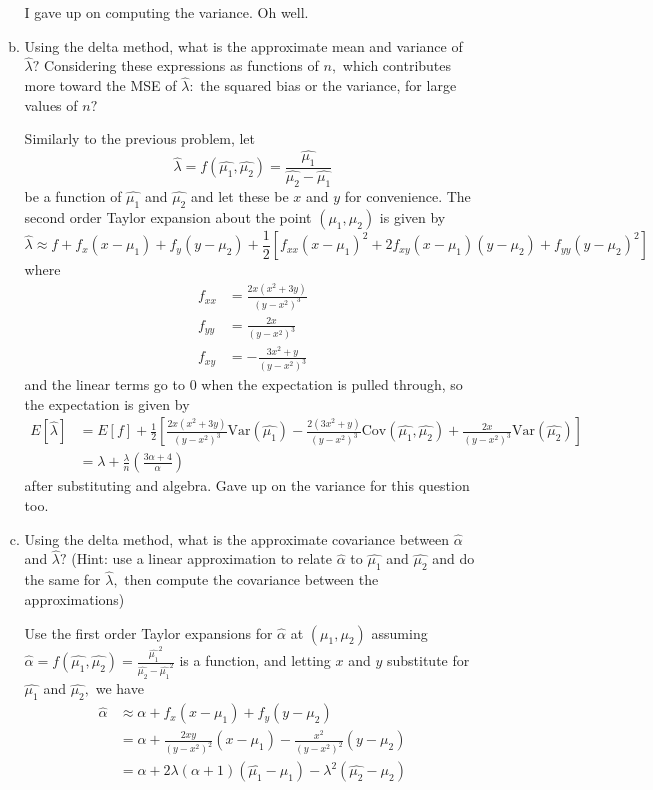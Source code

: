 \documentclass{article}
\newcommand{\var}{\mathrm{Var}}
\newcommand{\cov}{\mathrm{Cov}}
\begin{document}
\begin{enumerate}
\begin{enumerate}[(a)]
\begin{soln}
					I gave up on computing the variance. Oh well.

				\end{soln}

			\item Using the delta method, what is the approximate mean and variance of $\hat{\lambda}?$ Considering these expressions as functions of $n,$ which contributes more toward the MSE of $\hat{\lambda}:$ the squared bias or the variance, for large values of $n?$
				\begin{soln}
					Similarly to the previous problem, let \[\hat{\lambda}=f(\hat{\mu_1}, \hat{\mu_2})=\frac{\hat{\mu_1}}{\hat{\mu_2}-\hat{\mu_1}}\] be a function of $\hat{\mu_1}$ and $\hat{\mu_2}$ and let these be $x$ and $y$ for convenience. The second order Taylor expansion about the point $(\mu_1, \mu_2)$ is given by 
					\[\hat{\lambda} \approx f+f_x(x-\mu_1)+f_y(y-\mu_2)+\frac{1}{2}\left[ f_{xx}(x-\mu_1)^2+2f_{xy}(x-\mu_1)(y-\mu_2)+f_{yy}(y-\mu_2)^2 \right]\] where
					\begin{align*}
						f_{xx} &= \frac{2x(x^2+3y)}{(y-x^2)^3} \\
						f_{yy} &= \frac{2x}{(y-x^2)^3} \\
						f_{xy} &= -\frac{3x^2+y}{(y-x^2)^3}
					\end{align*} and the linear terms go to 0 when the expectation is pulled through, so the expectation is given by 
					\begin{align*}
						E[\hat{\lambda}] &= E[f] + \frac{1}{2}\left[ \frac{2x(x^2+3y)}{(y-x^2)^3}\var(\hat{\mu_1}) - \frac{2(3x^2+y)}{(y-x^2)^3}\cov(\hat{\mu_1}, \hat{\mu_2}) + \frac{2x}{(y-x^2)^3}\var(\hat{\mu_2}) \right] \\
						&=\lambda+\frac{\lambda}{n}\left( \frac{3\alpha+4}{\alpha} \right)
					\end{align*} after substituting and algebra. Gave up on the variance for this question too.

				\end{soln}

			\item Using the delta method, what is the approximate covariance between $\hat{\alpha}$ and $\hat{\lambda}?$ (Hint: use a linear approximation to relate $\hat{\alpha}$ to $\hat{\mu_1}$ and $\hat{\mu_2}$ and do the same for $\hat{\lambda},$ then compute the covariance between the approximations)
				\begin{soln}
					Use the first order Taylor expansions for $\hat{\alpha}$ at $(\mu_1, \mu_2)$ assuming $\hat{\alpha}=f(\hat{\mu_1}, \hat{\mu_2}) = \frac{\hat{\mu_1}^2}{\hat{\mu_2}-\hat{\mu_1}^2}$ is a function, and letting $x$ and $y$ substitute for $\hat{\mu_1}$ and $\hat{\mu_2},$ we have 
					\begin{align*}
						\hat{\alpha} &\approx \alpha + f_x(x-\mu_1) + f_y(y-\mu_2) \\
						&= \alpha + \frac{2xy}{(y-x^2)^2}(x-\mu_1) - \frac{x^2}{(y-x^2)^2}(y-\mu_2) \\
						&= \alpha + 2\lambda(\alpha+1)(\hat{\mu_1}-\mu_1) - \lambda^2(\hat{\mu_2}-\mu_2)
					\end{align*}


\end{soln}
\end{enumerate}
\end{enumerate}
\end{document}
